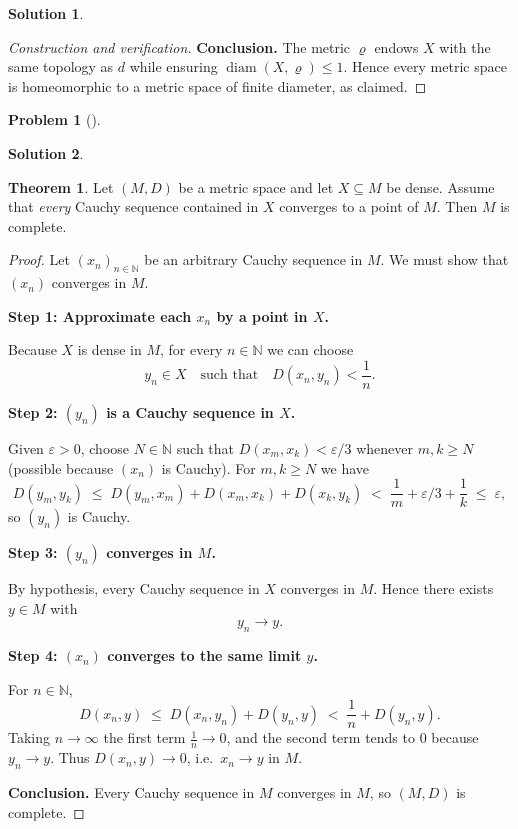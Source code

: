 \documentclass[12pt]{article}
\theoremstyle{definition} %
\newtheorem{solution}{Solution}
\newtheorem{problem}{Problem}
\newtheorem{theorem}{Theorem}
\theoremstyle{plain} %
\begin{document}
\begin{solution}
\begin{proof}[Construction and verification]
    \smallskip
    \noindent\textbf{Conclusion.}
    The metric $\varrho$ endows $X$ with the same topology as $d$ while ensuring
    $\operatorname{diam}(X,\varrho)\le 1$.  
    Hence every metric space is homeomorphic to a metric space of finite diameter, as claimed.
    \end{proof} 
\end{solution}
\begin{problem}[]
  
\end{problem}
\begin{solution}
  \begin{theorem}
    Let $(M,D)$ be a metric space and let $X\subseteq M$ be dense.
    Assume that \emph{every} Cauchy sequence contained in $X$ converges to a point of $M$.
    Then $M$ is complete.
    \end{theorem}
    
    \begin{proof}
    Let $(x_n)_{n\in\mathbb{N}}$ be an arbitrary Cauchy sequence in $M$.
    We must show that $(x_n)$ converges in $M$.
    
    \medskip
    \noindent\textbf{Step 1: Approximate each $x_n$ by a point in $X$.}
    
    Because $X$ is dense in $M$, for every $n\in\mathbb{N}$ we can choose
    \[
    y_n\in X
    \quad\text{such that}\quad
    D(x_n,y_n)<\frac1n.
    \]
    
    \medskip
    \noindent\textbf{Step 2: $(y_n)$ is a Cauchy sequence in $X$.}
    
    Given $\varepsilon>0$, choose $N\in\mathbb{N}$ such that
    $D(x_m,x_k)<\varepsilon/3$ whenever $m,k\ge N$ (possible because $(x_n)$ is Cauchy).
    For $m,k\ge N$ we have
    \[
    D(y_m,y_k)
    \;\le\;
    D(y_m,x_m)+D(x_m,x_k)+D(x_k,y_k)
    \;<\;
    \frac1m+\varepsilon/3+\frac1k
    \;\le\;
    \varepsilon,
    \]
    so $(y_n)$ is Cauchy.
    
    \medskip
    \noindent\textbf{Step 3: $(y_n)$ converges in $M$.}
    
    By hypothesis, every Cauchy sequence in $X$ converges in $M$.
    Hence there exists $y\in M$ with
    \[
    y_n\longrightarrow y.
    \]
    
    \medskip
    \noindent\textbf{Step 4: $(x_n)$ converges to the same limit $y$.}
    
    For $n\in\mathbb{N}$,
    \[
    D(x_n,y)
    \;\le\;
    D(x_n,y_n)+D(y_n,y)
    \;<\;
    \frac1n + D(y_n,y).
    \]
    Taking $n\to\infty$ the first term $\tfrac1n\to 0$,
    and the second term tends to $0$ because $y_n\to y$.
    Thus $D(x_n,y)\to 0$, i.e.\ $x_n\to y$ in $M$.
    
    \medskip
    \noindent\textbf{Conclusion.}
    Every Cauchy sequence in $M$ converges in $M$, so $(M,D)$ is complete.
    \end{proof} 
\end{solution}
\end{document}
